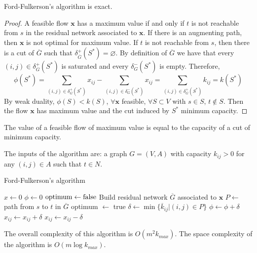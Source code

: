 \documentclass[12pt, a4paper]{report}
\begin{document}
    \begin{proposition}
        Ford-Fulkerson's algorithm is exact. 
    \end{proposition}
    \begin{proof}
        A feasible flow $\boldsymbol{x}$ has a maximum value if and only if $t$ is not reachable from $s$ in the residual network associated to $\boldsymbol{x}$. If 
        there is an augmenting path, then $\boldsymbol{x}$ is not optimal for maximum value. If $t$ is not reachable from $s$, then there is a cut of 
        $\overline{G}$ such that $\delta^{+}_{\overline{G}}(S^{*})=\varnothing$. By definition of $\overline{G}$ we have that every 
        $(i,j) \in \delta^{+}_{G}(S^{*})$ is saturated and every $\delta^{-}_{G}(S^{*})$ is empty. Therefore,
        \[\phi(S^{*})=\sum_{(i,j) \in \delta^{+}_{G}(S^{*})}{x_{ij}}-\sum_{(i,j) \in \delta^{-}_{G}(S^{*})}{x_{ij}}=
        \sum_{(i,j) \in \delta^{+}_{G}(S^{*})}{k_{ij}}=k(S^{*})\]
        By weak duality, $\phi(S) < k(S)$, $\forall \boldsymbol{x}$ feasible, $\forall S \subset V$ with $s \in S$, $t \notin S$. Then the flow $\boldsymbol{x}$ has
        maximum value and the cut induced by $S^{*}$ minimum capacity. 
    \end{proof}
    \begin{theorem}
        The value of a feasible flow of maximum value is equal to the capacity of a cut of minimum capacity.
    \end{theorem}
    The inputs of the algorithm are: a graph $G=(V,A)$ with capacity $k_{ij}>0$ for any $(i,j) \in A$ such that $t \in N$. 
    \begin{algorithm}[H]
        \caption{Ford-Fulkerson's algorithm}
            \begin{algorithmic}[1]
                \State $x \leftarrow 0$
                \State $\phi \leftarrow 0$
                \State $\textnormal{optimum} \leftarrow \textnormal{false}$
                    \State Build residual network $\overline{G}$ associated to $\boldsymbol{x}$
                    \State $P \leftarrow$ path from $s$ to $t$ in $\overline{G}$
                        \State optimum $\leftarrow$ true
                    \Else
                        \State $\delta \leftarrow \min\{\overline{k}_{ij}|(i,j) \in P\}$
                        \State $\phi \leftarrow \phi + \delta$
                                \State $x_{ij} \leftarrow x_{ij}+\delta$
                            \Else 
                                \State $x_{ij} \leftarrow x_{ij}-\delta$
                            \EndIf
                        \EndFor
                    \EndIf
                \EndWhile
            \end{algorithmic}
    \end{algorithm}
    The overall complexity of this algorithm is $O(m^2k_{max})$. The space complexity of the algorithm is $O(m\log{k_{max}})$. 
\end{document}
